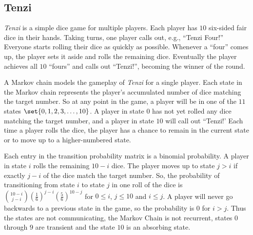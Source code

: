 \documentclass[12pt]{article}
\begin{document}
\subsection*{Tenzi}

\emph{Tenzi} is a simple dice game for multiple players.  Each player
has \( 10 \) six-sided fair dice in their hands.  Taking turns, one
player calls out, e.g., ``Tenzi Four!'' Everyone starts rolling their
dice as quickly as possible.  Whenever a ``four'' comes up, the player
sets it aside and rolls the remaining dice.  Eventually the player
achieves all \( 10 \) ``fours'' and calls out ``Tenzi!'', becoming the
winner of the round.%

A Markov chain models the gameplay of \emph{Tenzi} for a single player.
Each state in the Markov chain represents the player's accumulated
number of dice matching the target number.  So at any point in the game,
a player will be in one of the \( 11 \) states \( \set{0,1,2,3, \ldots,
10} \).  A player in state \( 0 \) has not yet rolled any dice matching
the target number, and a player in state \( 10 \) will call out
``Tenzi!' Each time a player rolls the dice, the player has a chance to
remain in the current state or to move up to a higher-numbered state.

Each entry in the transition probability matrix is a binomial
probability.  A player in state \( i \) rolls the remaining \( 10 - i \)
dice.  The player moves up to state \( j > i \) if exactly \( j - i \)
of the dice match the target number.  So, the probability of
transitioning from state \( i \) to state \( j \) in one roll of the
dice is \( \binom{10 - i}{j - i}\left( \frac{1}{6} \right)^{j - i} \left
( \frac{5}{6} \right)^{10 - j} \) for \( 0 \le i \), \( j \le 10 \) and \(
i \le j \).  A player will never go backwards to a previous state in the
game, so the probability is \( 0 \) for \( i>j \).  Thus the states are
not communicating, the Markov Chain is not recurrent, states \( 0 \)
through \( 9 \) are transient and the state \( 10 \) is an absorbing
state.~%
\end{document}
